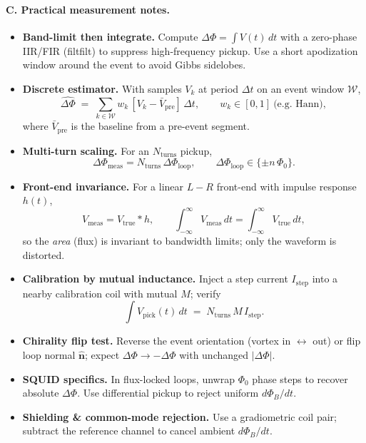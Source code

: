 \documentclass[12pt]{article}
\begin{document}
    \paragraph{C. Practical measurement notes.}
        \begin{itemize}
        \item \textbf{Band-limit then integrate.} Compute $\Delta\Phi=\int V(t)\,dt$ with a zero-phase IIR/FIR (filtfilt) to suppress high-frequency pickup. Use a short apodization window around the event to avoid Gibbs sidelobes.
        \item \textbf{Discrete estimator.} With samples $V_k$ at period $\Delta t$ on an event window $\mathcal{W}$,
        \[
            \widehat{\Delta\Phi}
            \;=\;
            \sum_{k\in\mathcal W} w_k\,[V_k-\bar V_\text{pre}]\,\Delta t,
            \qquad
            w_k\in[0,1]\ \text{(e.g.\ Hann)},
        \]
        where $\bar V_\text{pre}$ is the baseline from a pre-event segment.
        \item \textbf{Multi-turn scaling.} For an $N_\text{turns}$ pickup,
        \[
            \Delta\Phi_\text{meas}=N_\text{turns}\,\Delta\Phi_\text{loop},\qquad
            \Delta\Phi_\text{loop}\in\{\pm n\,\Phi_0\}.
        \]
        \item \textbf{Front-end invariance.} For a linear $L\!-\!R$ front-end with impulse response $h(t)$,
        \[
            V_\text{meas}=V_\text{true}*h,\qquad
            \int_{-\infty}^{\infty}\!\!V_\text{meas}\,dt
            =
            \int_{-\infty}^{\infty}\!\!V_\text{true}\,dt,
        \]
        so the \emph{area} (flux) is invariant to bandwidth limits; only the waveform is distorted.
        \item \textbf{Calibration by mutual inductance.} Inject a step current $I_\text{step}$ into a nearby calibration coil with mutual $M$; verify
        \[
            \int V_\text{pick}(t)\,dt \;=\; N_\text{turns}\,M\,I_\text{step}.
        \]
        \item \textbf{Chirality flip test.} Reverse the event orientation (vortex in $\leftrightarrow$ out) or flip loop normal $\hat{\mathbf n}$; expect $\Delta\Phi\to-\Delta\Phi$ with unchanged $|\Delta\Phi|$.
        \item \textbf{SQUID specifics.} In flux-locked loops, unwrap $\Phi_0$ phase steps to recover absolute $\Delta\Phi$. Use differential pickup to reject uniform $d\Phi_B/dt$.
        \item \textbf{Shielding \& common-mode rejection.} Use a gradiometric coil pair; subtract the reference channel to cancel ambient $d\Phi_B/dt$.

\end{itemize}
\end{document}
